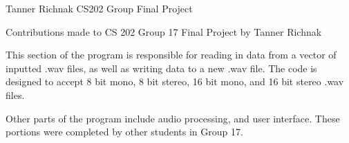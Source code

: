Tanner Richnak C\+S202 Group Final Project

Contributions made to CS 202 Group 17 Final Project by Tanner Richnak

This section of the program is responsible for reading in data from a vector of inputted .wav files, as well as writing data to a new .wav file. The code is designed to accept 8 bit mono, 8 bit stereo, 16 bit mono, and 16 bit stereo .wav files.

Other parts of the program include audio processing, and user interface. These portions were completed by other students in Group 17. 